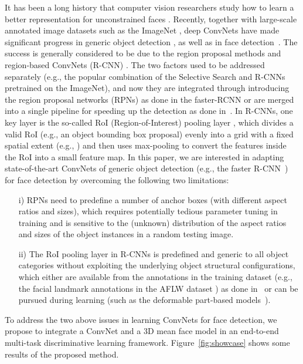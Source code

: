 \documentclass[runningheads]{llncs}
\begin{document}
It has been a long history that computer vision researchers study how to learn a better representation for unconstrained faces \cite{FaceDetSurvey,Face6Area,Face19Results}. Recently, together with large-scale annotated image datasets such as the ImageNet \cite{ImageNet}, deep ConvNets \cite{LeCunCNN,AlexNet} have made significant progress in  generic object detection \cite{FastRCNN,FasterRCNN,ResidualNet}, as well as in face detection~\cite{FaceCascadeCNN,DP2MFD}. The success is generally considered to be due to the region proposal methods and region-based ConvNets (R-CNN) \cite{RCNN}. The two factors used to be addressed separately (e.g., the popular combination of the Selective Search \cite{SS} and R-CNNs pretrained on the ImageNet), and now they are integrated through introducing the region proposal networks (RPNs) as done in the faster-RCNN \cite{FasterRCNN} or are merged into a single pipeline for speeding up the detection as done in~\cite{YOLO,liu15ssd}.  In R-CNNs, one key layer is the so-called RoI (Region-of-Interest) pooling layer \cite{FastRCNN}, which divides a valid RoI (e.g., an object bounding box proposal) evenly into a grid with a fixed spatial extent (e.g., ) and then uses max-pooling to convert the features inside the RoI into a small feature map. In this paper, we are interested in adapting state-of-the-art ConvNets of generic object detection (e.g., the faster R-CNN~\cite{FasterRCNN}) for face detection by overcoming the following two limitations:
\begin{enumerate}
\item[i)] RPNs need to predefine a number of anchor boxes (with different aspect ratios and sizes), which requires potentially tedious parameter tuning in training and is sensitive to the (unknown) distribution of the aspect ratios and sizes of the object instances in a random testing image.
\item[ii)] The RoI pooling layer in R-CNNs is predefined and generic to all object categories without exploiting the underlying object structural configurations, which either are available from the annotations in the training dataset (e.g., the facial landmark annotations in the AFLW dataset \cite{AFLW}) as done in~\cite{AFW} or can be pursued during learning (such as the deformable part-based models~\cite{DPM,DP2MFD}).
\end{enumerate}

To address the two above issues in learning ConvNets for face detection, we propose to integrate a ConvNet and a 3D mean face model in an end-to-end multi-task discriminative learning framework.
Figure~\ref{fig:showcase} shows some results of the proposed method.
\end{document}
